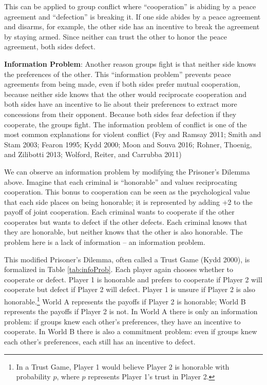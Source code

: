 \documentclass[11pt]{article}
\begin{document}
This can be applied to group conflict where ``cooperation'' is abiding
by a peace agreement and ``defection'' is breaking it. If one side
abides by a peace agreement and disarms, for example, the other side has
an incentive to break the agreement by staying armed. Since neither can
trust the other to honor the peace agreement, both sides defect.\newline

\noindent \textbf{Information Problem}: Another reason groups fight is
that neither side knows the preferences of the other. This ``information
problem'' prevents peace agreements from being made, even if both sides
prefer mutual cooperation, because neither side knows that the other
would reciprocate cooperation and both sides have an incentive to lie
about their preferences to extract more concessions from their opponent.
Because both sides fear defection if they cooperate, the groups fight.
The information problem of conflict is one of the most common
explanations for violent conflict (Fey and Ramsay 2011; Smith and Stam
2003; Fearon 1995; Kydd 2000; Moon and Souva 2016; Rohner, Thoenig, and
Zilibotti 2013; Wolford, Reiter, and Carrubba 2011)

We can observe an information problem by modifying the Prisoner's
Dilemma above. Imagine that each criminal is ``honorable'' and values
reciprocating cooperation. This bonus to cooperation can be seen as the
psychological value that each side places on being honorable; it is
represented by adding +2 to the payoff of joint cooperation. Each
criminal wants to cooperate if the other cooperates but wants to defect
if the other defects. Each criminal knows that they are honorable, but
neither knows that the other is also honorable. The problem here is a
lack of information -- an information problem.

This modified Prisoner's Dilemma, often called a Trust Game (Kydd 2000),
is formalized in Table \ref{tab:infoProb}. Each player again chooses
whether to cooperate or defect. Player 1 is honorable and prefers to
cooperate if Player 2 will cooperate but defect if Player 2 will defect.
Player 1 is unsure if Player 2 is also honorable.\footnote{In a Trust
  Game, Player 1 would believe Player 2 is honorable with probability
  \(p\), where \(p\) represents Player 1's trust in Player 2.} World A
represents the payoffs if Player 2 is honorable; World B represents the
payoffs if Player 2 is not. In World A there is only an information
problem: if groups knew each other's preferences, they have an incentive
to cooperate. In World B there is also a commitment problem: even if
groups knew each other's preferences, each still has an incentive to
defect.
\end{document}
